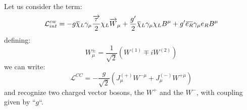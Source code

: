 Let us consider the term:
\begin{equation}
  \label{eq:15}
  \mathcal{L}_{int}^{ew} = - g \overbar{\chi}_{L} \gamma_{\mu}
  \frac{\vect{\tau}}{2} \chi_{L} \vect{W}_{\mu} + \frac{g'}{2}
  \overbar{\chi}_{L} \gamma_{\mu} \chi_{L} B^{\mu} + g' \overbar{e_{R}}
  \gamma_{\mu} e_{R} B^{\mu}
\end{equation}
defining:
\begin{equation}
  \label{eq:16}
  W^{\pm}_{\mu} = \frac{1}{\sqrt{2}} \left( W^{(1)} \mp i W^{(2)} \right)
\end{equation}
we can write:
\begin{equation}
  \label{eq:17}
  \mathcal{L}^{CC} = - \frac{g}{\sqrt{2}} \left(J^{(+)}_{\mu} W^{- \mu} +
    J^{(-)}_{\mu} W^{+ \mu} \right)
\end{equation}
and recognize two charged vector bosons, the $W^+$ and the $W^-$, with coupling
given by ``$g$``.
